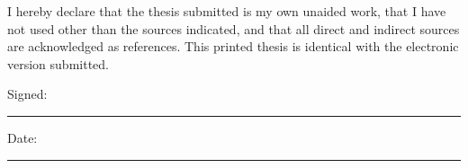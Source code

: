 \noindent I hereby declare that the thesis submitted is my own unaided work, that I have not used other than the sources indicated, and that all direct and indirect sources are acknowledged as references. This printed thesis is identical with the electronic version submitted.


 
\noindent Signed:\\
\rule[0.5em]{25em}{0.5pt} %
 
\noindent Date:\\
\rule[0.5em]{25em}{0.5pt} %
